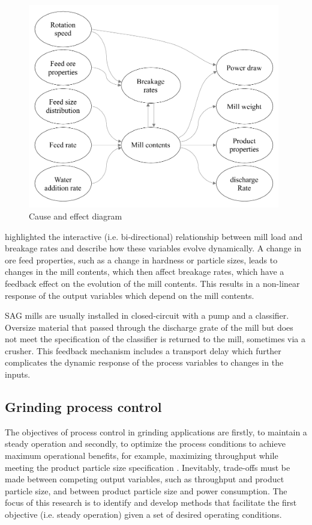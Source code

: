 \begin{figure}[htp]
	\centering
	\includegraphics[width=11cm]{images/cause-effect.pdf}
	\caption{Cause and effect diagram} \label{fig:cause-effect}
\end{figure}

\cite{powell_applying_2009} highlighted the interactive (i.e. bi-directional) relationship between mill load and breakage rates and describe how these variables evolve dynamically. A change in ore feed properties, such as a change in hardness or particle sizes, leads to changes in the mill contents, which then affect breakage rates, which have a feedback effect on the evolution of the mill contents. This results in a non-linear response of the output variables which depend on the mill contents.

SAG mills are usually installed in closed-circuit with a pump and a classifier. Oversize material that passed through the discharge grate of the mill but does not meet the specification of the classifier is returned to the mill, sometimes via a crusher. This feedback mechanism includes a transport delay which further complicates the dynamic response of the process variables to changes in the inputs.

\subsection{Grinding process control}

The objectives of process control in grinding applications are firstly, to maintain a steady operation and secondly, to optimize the process conditions to achieve maximum operational benefits, for example, maximizing throughput while meeting the product particle size specification \citep{wei_grinding_2009}. Inevitably, trade-offs must be made between competing output variables, such as throughput and product particle size, and between product particle size and power consumption. The focus of this research is to identify and develop methods that facilitate the first objective (i.e. steady operation) given a set of desired operating conditions.

